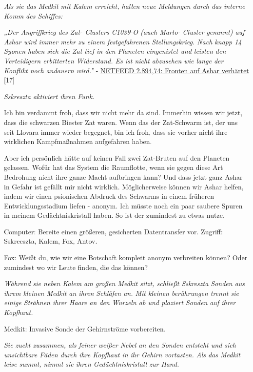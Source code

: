 \documentclass[11pt]{scrartcl}
\begin{document}
\emph{Als sie das Medkit mit Kalem erreicht, hallen neue Meldungen durch
das interne Komm des Schiffes:}

\emph{„Der Angriffkrieg des Zat- Clusters C1039-O (auch Marto- Cluster
genannt) auf Ashar wird immer mehr zu einem festgefahrenen
Stellungskrieg. Nach knapp 14 Syonen haben sich die Zat tief in den
Planeten eingenistet und leisten den Verteidigern erbitterten
Widerstand. Es ist nicht abzusehen wie lange der Konflikt noch andauern
wird.''} -
\href{http://1w6.org/deutsch/welten/raumzeit/netfeed-archiv/netfeed-flag-news/politics/netfeed-289474-fornten-auf-ashar-v}{NETFEED
2.894,74: Fronten auf Ashar verhärtet} {[}17{]}

\emph{Sskreszta aktiviert ihren Funk.}

Ich bin verdammt froh, dass wir nicht mehr da sind. Immerhin wissen wir
jetzt, dass die schwarzen Biester Zat waren. Wenn das der Zat-Schwarm
ist, der uns seit Llovara immer wieder begegnet, bin ich froh, dass sie
vorher nicht ihre wirklichen Kampfmaßnahmen aufgefahren haben.

Aber ich persönlich hätte auf keinen Fall zwei Zat-Bruten auf den
Planeten gelassen. Wofür hat das System die Raumflotte, wenn sie gegen
diese Art Bedrohung nicht ihre ganze Macht aufbringen kann? Und dass
jetzt ganz Ashar in Gefahr ist gefällt mir nicht wirklich.
Möglicherweise können wir Ashar helfen, indem wir einen psionischen
Abdruck des Schwarms in einem früheren Entwicklungsstadium liefen -
anonym. Ich müsste noch ein paar saubere Spuren in meinem
Gedächtniskristall haben. So ist der zumindest zu etwas nutze.

Computer: Bereite einen größeren, gesicherten Datentransfer vor.
Zugriff: Sskreeszta, Kalem, Fox, Antov.

Fox: Weißt du, wie wir eine Botschaft komplett anonym verbreiten können?
Oder zumindest wo wir Leute finden, die das können?

\emph{Während sie neben Kalem am großen Medkit sitzt, schließt Sskreszta
Sonden aus ihrem kleinen Medkit an ihren Schläfen an. Mit kleinen
berührungen trennt sie einige Strähnen ihrer Haare an den Wurzeln ab und
plaziert Sonden auf ihrer Kopfhaut.}

Medkit: Invasive Sonde der Gehirnströme vorbereiten.

\emph{Sie zuckt zusammen, als feiner weißer Nebel an den Sonden entsteht
und sich unsichtbare Fäden durch ihre Kopfhaut in ihr Gehirn vortasten.
Als das Medkit leise summt, nimmt sie ihren Gedächtniskristall zur
Hand.}
\end{document}
